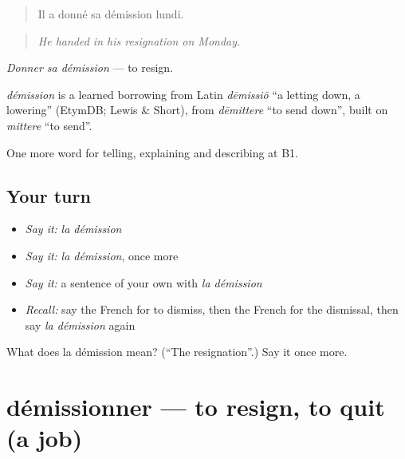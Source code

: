 \begin{quote}
Il a donné sa démission lundi.
\end{quote}

\begin{quote}
\emph{He handed in his resignation on Monday.}
\end{quote}

\emph{Donner sa démission} — to resign.

\begin{cousinweb}
\emph{démission} is a learned borrowing from Latin \emph{dēmissiō} \textquotedblleft{}a letting down, a lowering\textquotedblright{} (EtymDB; Lewis \& Short), from \emph{dēmittere} \textquotedblleft{}to send down\textquotedblright{}, built on \emph{mittere} \textquotedblleft{}to send\textquotedblright{}.
\end{cousinweb}

\begin{grammarlens}[title={What you've built}]
One more word for telling, explaining and describing at B1.
\end{grammarlens}

\subsection*{Your turn}
\begin{itemize}
\raggedright
  \item \emph{Say it:} \emph{la démission}
  \item \emph{Say it:} \emph{la démission}, once more
  \item \emph{Say it:} a sentence of your own with \emph{la démission}
  \item \emph{Recall:} say the French for to dismiss, then the French for the dismissal, then say \emph{la démission} again
\end{itemize}

\begin{tcolorbox}[breakable,colback=teal!4,colframe=teal!35!black,title={Before you move on}]
What does la démission mean? (\textquotedblleft{}The resignation\textquotedblright{}.) Say it once more.
\end{tcolorbox}
\section[démissionner]{démissionner — to resign, to quit (a job)}

\label{lesson:FR-C355-demissionner}



